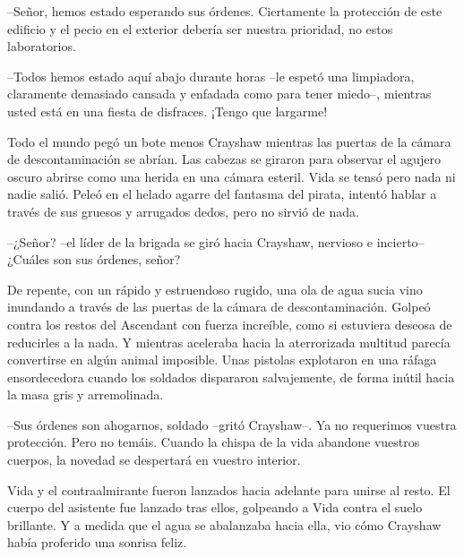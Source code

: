 {--Señor, hemos estado esperando sus órdenes. Ciertamente la protección
 de este edificio y el pecio en el exterior debería ser nuestra
prioridad, no estos laboratorios.}

{--Todos hemos estado aquí abajo durante horas --le espetó una
 limpiadora, claramente demasiado cansada y enfadada como para tener
 miedo--, mientras usted está en una fiesta de disfraces. ¡Tengo que
largarme!}

{Todo el mundo pegó un bote menos Crayshaw mientras las puertas de la
 cámara de descontaminación se abrían. Las cabezas se giraron para
 observar el agujero oscuro abrirse como una herida en una cámara
 esteril. Vida se tensó pero nada ni nadie salió. Peleó en el helado
 agarre del fantasma del pirata, intentó hablar a través de sus gruesos y
arrugados dedos, pero no sirvió de nada.}

{--¿Señor? --el líder de la brigada se giró hacia Crayshaw, nervioso e
incierto-- ¿Cuáles son sus órdenes, señor?}

{De repente, con un rápido y estruendoso rugido, una ola de agua sucia
 vino inundando a través de las puertas de la cámara de descontaminación.
 Golpeó contra los restos del Ascendant con fuerza increíble, como si
 estuviera deseosa de reducirles a la nada. Y mientras aceleraba hacia la
 aterrorizada multitud parecía convertirse en algún animal imposible.
 Unas pistolas explotaron en una ráfaga ensordecedora cuando los soldados
 dispararon salvajemente, de forma inútil hacia la masa gris y
arremolinada.}

{--Sus órdenes son ahogarnos, soldado --gritó Crayshaw--. Ya no
 requerimos vuestra protección. Pero no temáis. Cuando la chispa de la
 vida abandone vuestros cuerpos, la novedad se despertará en vuestro
interior.}

{Vida y el contraalmirante fueron lanzados hacia adelante para unirse al
 resto. El cuerpo del asistente fue lanzado tras ellos, golpeando a Vida
 contra el suelo brillante. Y a medida que el agua se abalanzaba hacia
ella, vio cómo Crayshaw había proferido una sonrisa feliz.}
